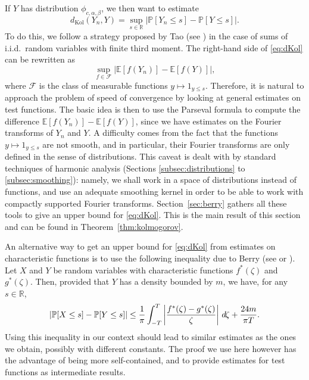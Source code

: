 \documentclass[envcountsame]{svmult}
\newcommand{\R}{\mathbb{R}}
\newcommand{\esper}{\mathbb{E}}
\newcommand{\proba}{\mathbb{P}}
\newcommand{\dkol}{d_\mathrm{Kol}}
\newcommand{\DD}[1]{\,d\hspace*{-0.3mm}{#1}}
\begin{document}
If $Y$ has distribution $\phi_{c,\alpha,\beta}$, we then want to estimate
\begin{equation}
  \dkol(Y_n,Y) = \sup_{s \in \R} |\proba[Y_n \leq s] - \proba[Y \leq s]|.
  \label{eq:dKol}
\end{equation}
To do this, we follow a strategy proposed by Tao (see \cite[Section 2.2]{Tao12})
in the case of sums of i.i.d.~random variables
with finite third moment.
The right-hand side of \eqref{eq:dKol} can be rewritten as
$$\sup_{f \in \mathcal{F}} |\esper[f(Y_n)] - \esper[f(Y)]|,$$
where $\mathcal{F}$ is the class of measurable functions $y \mapsto 1_{y \leq s}$. 
Therefore, it is natural to approach the problem of speed of convergence by looking at general estimates on test functions.
The basic idea is then to use the Parseval formula to compute the difference $\esper[f(Y_n)] - \esper[f(Y)]$, since we have estimates on the Fourier transforms of $Y_n$ and $Y$.
A difficulty comes from the fact that the functions $y \mapsto 1_{y \leq s}$ are not smooth,
and in particular, their Fourier transforms are only defined in the sense of distributions.
This caveat is dealt with by standard techniques of harmonic analysis (Sections \ref{subsec:distributions} to \ref{subsec:smoothing}): namely, we shall work in a space of distributions instead of functions, and use an adequate smoothing kernel in order to be able to work with compactly supported Fourier transforms.
Section~\ref{sec:berry} gathers all these tools to give an upper bound for \eqref{eq:dKol}.
This is the main result of this section and can be found in Theorem~\ref{thm:kolmogorov}.

\begin{remark}
  An alternative way to get an upper bound  for \eqref{eq:dKol} from estimates on characteristic functions
  is to use the following inequality due to Berry (see \cite{Berry1941} or \cite[Lemma XVI.3.2]{Fel71}).
  Let $X$ and $Y$ be random variables with characteristic functions $f^{*}(\zeta)$ and $g^{*}(\zeta)$.
  Then, provided that $Y$ has a density bounded by $m$, we have, for any $s \in \R$,
$$\left|\proba[X \leq s] - \proba[Y \leq s]\right|\leq \frac{1}{\pi} \int_{-T}^{T}
\left|\frac{f^{*}(\zeta)-g^{*}(\zeta)}{\zeta}\right|\DD{\zeta} +\frac{24m}{\pi T}.$$
 Using this inequality in our context should lead to similar estimates as the ones we obtain,
 possibly with different constants.
 The proof we use here however has the advantage of being more self-contained,
 and to provide estimates for test functions as intermediate results.
\end{remark}
\end{document}
